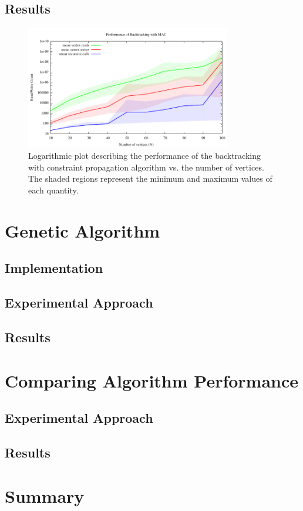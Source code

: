 \documentclass{article}
\begin{document}
	\subsection{Results}
	
		\begin{figure}[h!]
			\centering
			\includegraphics[width=0.8\textwidth]{../results_4/backtracking_mac/bt_mac_performance}
			\caption{Logarithmic plot describing the performance of the backtracking with constraint propagation algorithm vs. the number of vertices. The shaded regions represent the minimum and maximum values of each quantity.}
		\end{figure}
	
\section{Genetic Algorithm}

	\subsection{Implementation}

	\subsection{Experimental Approach}
	
	\subsection{Results}
	
\section{Comparing Algorithm Performance}
	\label{comparisons}
	
	\subsection{Experimental Approach}
	
	\subsection{Results}
	
	
\section{Summary}

	




	
	
	
\end{document}

